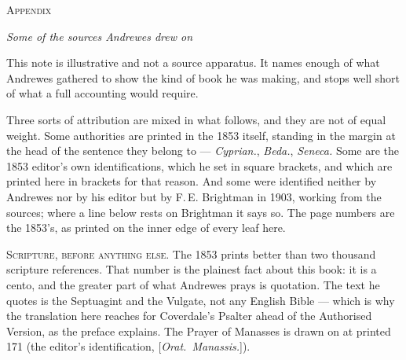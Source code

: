 \begingroup
\setlength{\parskip}{0.55\baselineskip}
\setlength{\parindent}{0pt}
{\centering\Large\scshape Appendix\par}
\vspace{0.4\baselineskip}
{\centering\itshape Some of the sources Andrewes drew on\par}
\vspace{1.5\baselineskip}

This note is illustrative and not a source apparatus. It names enough of what
Andrewes gathered to show the kind of book he was making, and stops well short of
what a full accounting would require.

Three sorts of attribution are mixed in what follows, and they are not of equal
weight. Some authorities are printed in the 1853 itself, standing in the margin at
the head of the sentence they belong to --- \emph{Cyprian.}, \emph{Beda.},
\emph{Seneca.} Some are the 1853 editor's own identifications, which he set in
square brackets, and which are printed here in brackets for that reason. And some
were identified neither by Andrewes nor by his editor but by F.\,E. Brightman in
1903, working from the sources; where a line below rests on Brightman it says so.
The page numbers are the 1853's, as printed on the inner edge of every leaf here.

\vspace{0.8\baselineskip}
{\scshape Scripture, before anything else.}\quad
The 1853 prints better than two thousand scripture references. That number is the
plainest fact about this book: it is a cento, and the greater part of what
Andrewes prays is quotation. The text he quotes is the Septuagint and the Vulgate,
not any English Bible --- which is why the translation here reaches for
Coverdale's Psalter ahead of the Authorised Version, as the preface explains. The
Prayer of Manasses is drawn on at printed 171 (the editor's
identification, [\emph{Orat.\ Manassis.}]).

